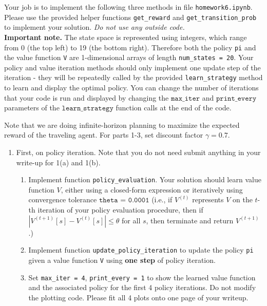 \documentclass[submit]{../harvardml}
\begin{document}
\begin{problem}
Your job is to implement the following three methods in file \texttt{homework6.ipynb}. Please use the provided helper functions \texttt{get\_reward} and \texttt{get\_transition\_prob} to implement your solution. \emph{Do not use any outside code.} \\

\noindent \textbf{Important note.} The state space is represented using integers, which range from 0 (the top left) to 19 (the bottom right). Therefore both the policy \texttt{pi} and the value function \texttt{V} are 1-dimensional arrays of length \texttt{num\_states = 20}. Your policy and value iteration methods should only implement one update step of the iteration - they will be repeatedly called by the provided \texttt{learn\_strategy} method to learn and display the optimal policy. You can change the number of iterations that your code is run and displayed by changing the $\texttt{max\_iter}$ and $\texttt{print\_every}$ parameters of the $\texttt{learn\_strategy}$ function calls at the end of the code.

Note that we are doing infinite-horizon planning to maximize the expected reward of the traveling agent. For parts 1-3, set discount factor $\gamma = 0.7$.

\begin{enumerate}
    \item First, on policy iteration. Note that you do not need submit anything in your write-up for 1(a) and 1(b).
    \begin{enumerate}
        \item Implement function \texttt{policy\_evaluation}.  Your solution should learn value function $V$, either using a closed-form expression or iteratively using convergence tolerance $\texttt{theta = 0.0001}$ (i.e., if $V^{(t)}$ represents $V$ on the $t$-th iteration of your policy evaluation procedure, then if $|V^{(t + 1)}[s] - V^{(t)}[s]| \leq \theta$ for all $s$, then terminate and return $V^{(t + 1)}$.)
    
        \item Implement function \texttt{update\_policy\_iteration} to update the policy \texttt{pi} given a value function \texttt{V} using \textbf{one step} of policy iteration.
        
        \item Set \texttt{max\_iter = 4}, \texttt{print\_every = 1} to show the learned value function and the associated policy for the first 4 policy iterations. Do not modify the plotting code. Please fit all 4 plots onto one page of your writeup.
        

\end{enumerate}
\end{enumerate}
\end{problem}
\end{document}
